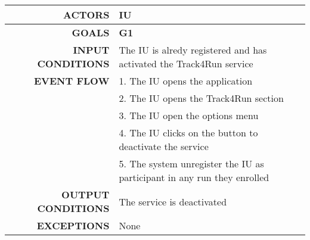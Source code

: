 \begin{table}[h!]
\begin{tabular}{|r|p{3in}|}
\hline
\textbf{ACTORS} & IU\\
\hline
\textbf{GOALS} & \textbf{G1} \\
\hline
\textbf{INPUT CONDITIONS} & The IU is alredy registered and has activated the Track4Run service \\
\hline
\textbf{EVENT FLOW} 
&1. The IU opens the application \\
&2. The IU opens the Track4Run section\\
&3. The IU open the options menu\\
&4. The IU clicks on the button to deactivate the service \\
&5. The system unregister the IU as participant in any run they enrolled \\
\hline
\textbf{OUTPUT CONDITIONS} & The service is deactivated  \\
\hline
\textbf{EXCEPTIONS} 
& None \\
\hline
\end{tabular}
\end{table}